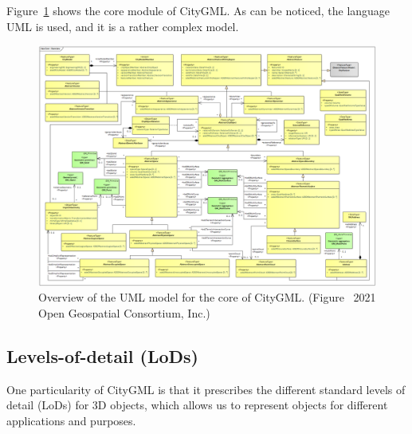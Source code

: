 Figure~\ref{fig:citygml_uml_core} shows the core module of CityGML\@.
As can be noticed, the language UML is used, and it is a rather complex model.
\begin{figure}
  \centering
  \includegraphics[width=0.95\linewidth]{figs/citygml_uml_core}
  \caption{Overview of the UML model for the core of CityGML\@. (Figure \textcopyright\ 2021 Open Geospatial Consortium, Inc.)}%
\label{fig:citygml_uml_core}
\end{figure}

%

\subsection{Levels-of-detail (LoDs)} 

One particularity of CityGML is that it prescribes the different standard levels of detail (LoDs) for 3D objects, which allows us to represent objects for different applications and purposes.

